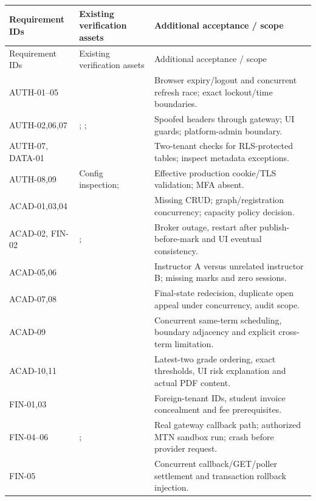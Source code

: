 \documentclass[10pt,a4paper]{article}
\begin{document}
\begin{longtable}{@{}L{31mm}L{60mm}L{69mm}@{}}
\toprule Requirement IDs & Existing verification assets & Additional acceptance / scope\\\midrule\endfirsthead
\toprule Requirement IDs & Existing verification assets & Additional acceptance / scope\\\midrule\endhead
\bottomrule\endfoot
AUTH-01--05 &  & Browser expiry/logout and concurrent refresh race; exact lockout/time boundaries.\\
AUTH-02,06,07 & ; ;  & Spoofed headers through gateway; UI guards; platform-admin boundary.\\
AUTH-07, DATA-01 &  & Two-tenant checks for RLS-protected tables; inspect metadata exceptions.\\
AUTH-08,09 & Config inspection;  & Effective production cookie/TLS validation; MFA absent.\\
ACAD-01,03,04 &  & Missing CRUD; graph/registration concurrency; capacity policy decision.\\
ACAD-02, FIN-02 & ;  & Broker outage, restart after publish-before-mark and UI eventual consistency.\\
ACAD-05,06 &  & Instructor A versus unrelated instructor B; missing marks and zero sessions.\\
ACAD-07,08 &  & Final-state redecision, duplicate open appeal under concurrency, audit scope.\\
ACAD-09 &  & Concurrent same-term scheduling, boundary adjacency and explicit cross-term limitation.\\
ACAD-10,11 &  & Latest-two grade ordering, exact thresholds, UI risk explanation and actual PDF content.\\
FIN-01,03 &  & Foreign-tenant IDs, student invoice concealment and fee prerequisites.\\
FIN-04--06 & ;  & Real gateway callback path; authorized MTN sandbox run; crash before provider request.\\
FIN-05 &  & Concurrent callback/GET/poller settlement and transaction rollback injection.\\

\end{longtable}
\end{document}
